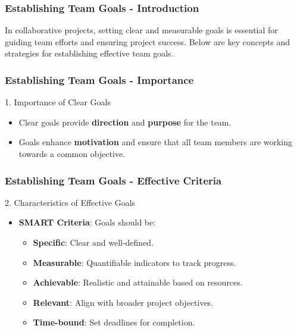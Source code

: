 \documentclass[aspectratio=169]{beamer}
\begin{document}
\begin{frame}[fragile]
    \frametitle{Establishing Team Goals - Introduction}
    In collaborative projects, setting clear and measurable goals is essential for guiding team efforts and ensuring project success. Below are key concepts and strategies for establishing effective team goals.
\end{frame}

\begin{frame}[fragile]
    \frametitle{Establishing Team Goals - Importance}
    \begin{block}{1. Importance of Clear Goals}
        \begin{itemize}
            \item Clear goals provide \textbf{direction} and \textbf{purpose} for the team.
            \item Goals enhance \textbf{motivation} and ensure that all team members are working towards a common objective.
        \end{itemize}
    \end{block}
\end{frame}

\begin{frame}[fragile]
    \frametitle{Establishing Team Goals - Effective Criteria}
    \begin{block}{2. Characteristics of Effective Goals}
        \begin{itemize}
            \item \textbf{SMART Criteria}: Goals should be:
            \begin{itemize}
                \item \textbf{Specific}: Clear and well-defined.
                \item \textbf{Measurable}: Quantifiable indicators to track progress.
                \item \textbf{Achievable}: Realistic and attainable based on resources.
                \item \textbf{Relevant}: Align with broader project objectives.
                \item \textbf{Time-bound}: Set deadlines for completion.
            \end{itemize}
        \end{itemize}
    \end{block}
\end{frame}
\end{document}
